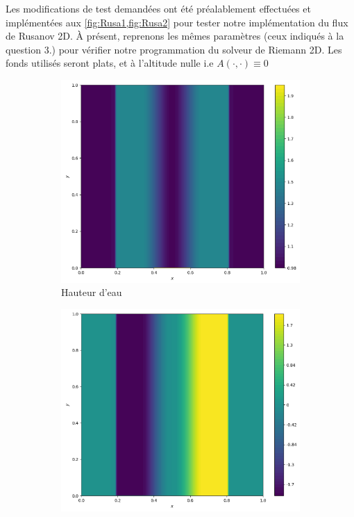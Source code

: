 \documentclass[
	french,
	11pt, %
]{fphw}
\begin{document}
Les modifications de test demandées ont été préalablement effectuées et implémentées aux \cref{fig:Rusa1,fig:Rusa2} pour tester notre implémentation du flux de Rusanov 2D. À présent, reprenons les mêmes paramètres (ceux indiqués à la question 3.) pour vérifier notre programmation du solveur de Riemann 2D. Les fonds utilisés seront plats, et à l'altitude nulle i.e $A(\cdot,\cdot) \equiv 0$


\begin{figure}[H]
	\centering
	\begin{subfigure}{0.32\textwidth}
		\centering
		\includegraphics[width=\textwidth,height=0.85\textwidth]{Riem1h.png}
		\caption{Hauteur d'eau}
		\label{fig:Riem1h}
	\end{subfigure}
	\begin{subfigure}{0.32\textwidth}
		\centering
		\includegraphics[width=\textwidth,height=0.85\textwidth]{Riem1u.png}

\end{subfigure}
\end{figure}
\end{document}
